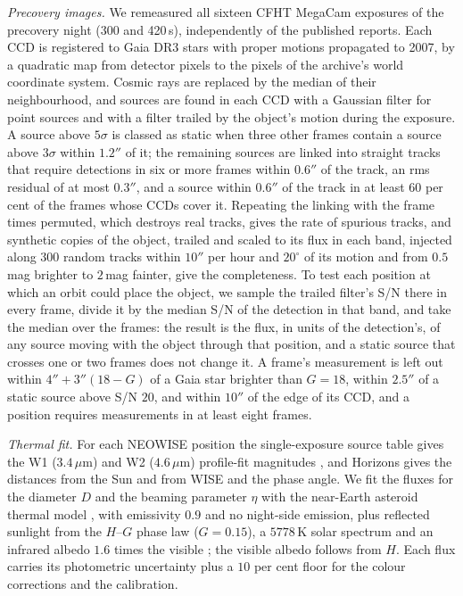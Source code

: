 \documentclass[3p,11pt]{elsarticle}
\begin{document}
\emph{Precovery images.} We remeasured all sixteen CFHT MegaCam exposures of the
precovery night (300 and 420\,s), independently of the published reports. Each CCD is registered to Gaia DR3 stars
with proper motions propagated to 2007, by a quadratic map from detector pixels to the
pixels of the archive's world coordinate system. Cosmic rays are replaced by the median of
their neighbourhood, and sources are found in each CCD with a Gaussian filter for point
sources and with a filter trailed by the object's motion during the exposure. A source above
$5\sigma$ is classed as static when three other frames contain a source above $3\sigma$
within $1.2''$ of it; the remaining sources are linked into straight tracks that require
detections in six or more frames within $0.6''$ of the track, an rms residual of at most
$0.3''$, and a source within $0.6''$ of the track in at least 60 per cent of the frames
whose CCDs cover it. Repeating the linking with the frame times permuted, which destroys
real tracks, gives the rate of spurious tracks, and synthetic copies of the object,
trailed and scaled to its flux in each band, injected along $300$ random tracks
within $10''$ per hour and $20^\circ$ of its motion and from $0.5$\,mag brighter to
$2$\,mag fainter, give the completeness. To test each position at which an orbit could place the object, we sample the
trailed filter's S/N there in every frame, divide it by the median S/N of the detection in
that band, and take the median over the frames: the result is the flux, in units of the
detection's, of any source moving with the object through that position, and a static
source that crosses one or two frames does not change it. A frame's measurement is left
out within $4''+3''(18-G)$ of a Gaia star brighter than $G=18$, within $2.5''$ of a static
source above S/N $20$, and within $10''$ of the edge of its CCD, and a position requires
measurements in at least eight frames.

\emph{Thermal fit.} For each NEOWISE position the single-exposure source table gives the
W1 ($3.4\,\mu$m) and W2 ($4.6\,\mu$m) profile-fit magnitudes \citep{Wright2010,Mainzer2014},
and Horizons gives the distances from the Sun and from WISE and the phase angle. We fit
the fluxes for the diameter $D$ and the beaming parameter $\eta$ with the near-Earth
asteroid thermal model \citep{Harris1998}, with emissivity $0.9$ and no night-side
emission, plus reflected sunlight from the $H$--$G$ phase law \citep{Bowell1989}
($G=0.15$), a $5778$\,K solar spectrum and an infrared albedo $1.6$ times the
visible \citep{Mainzer2011}; the visible albedo follows from $H$. Each flux carries its
photometric uncertainty plus a $10$ per cent floor for the colour corrections and the
calibration.
\end{document}
